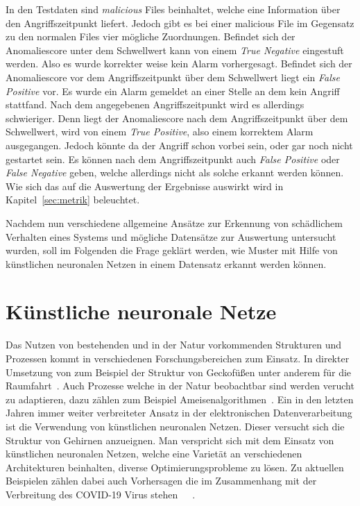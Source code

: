             In den Testdaten sind \textit{malicious}  Files beinhaltet, welche eine Information über den Angriffszeitpunkt liefert. 
            Jedoch gibt es bei einer malicious File im Gegensatz zu den normalen Files  vier mögliche Zuordnungen.
            Befindet sich der Anomaliescore unter dem Schwellwert kann von einem \textit{True Negative} eingestuft werden.
            Also es wurde korrekter weise kein Alarm vorhergesagt.
            Befindet sich der Anomaliescore vor dem Angriffszeitpunkt über dem Schwellwert liegt ein \textit{False Positive} vor.
            Es wurde ein Alarm gemeldet an einer Stelle an dem kein Angriff stattfand.
            Nach dem angegebenen Angriffszeitpunkt wird es allerdings schwieriger.
            Denn liegt der Anomaliescore nach dem Angriffszeitpunkt über dem Schwellwert, wird von einem \textit{True Positive}, also einem korrektem Alarm ausgegangen.
            Jedoch könnte da der Angriff schon vorbei sein, oder gar noch nicht gestartet sein.
            Es können nach dem Angriffszeitpunkt auch \textit{False Positive} oder \textit{False Negative} geben, welche allerdings nicht als solche erkannt werden können.
            Wie sich das auf die Auswertung der Ergebnisse auswirkt wird in Kapitel~\ref{sec:metrik} beleuchtet.

            Nachdem nun verschiedene allgemeine Ansätze zur Erkennung von schädlichem Verhalten eines Systems und mögliche Datensätze zur Auswertung untersucht wurden,
            soll im Folgenden die Frage geklärt werden, wie Muster mit Hilfe von künstlichen neuronalen Netzen in einem Datensatz erkannt werden können.

    \section{Künstliche neuronale Netze}\label{sec:KNN}        
        Das Nutzen von bestehenden und in der Natur vorkommenden Strukturen und Prozessen kommt in verschiedenen Forschungsbereichen zum Einsatz.
        In direkter Umsetzung von zum Beispiel der Struktur von Geckofüßen unter anderem für die Raumfahrt~\cite{GECKO}.%
        Auch Prozesse welche in der Natur beobachtbar sind werden verucht zu adaptieren, dazu zählen zum Beispiel Ameisenalgorithmen~\cite{ANT}.
        Ein in den letzten Jahren immer weiter verbreiteter Ansatz in der elektronischen Datenverarbeitung ist die Verwendung von künstlichen neuronalen Netzen.
        Dieser versucht sich die Struktur von Gehirnen anzueignen.
        Man verspricht sich mit dem Einsatz von künstlichen neuronalen Netzen, welche eine Varietät an verschiedenen Architekturen beinhalten, diverse Optimierungsprobleme zu lösen.
        Zu aktuellen Beispielen zählen dabei auch Vorhersagen die im Zusammenhang mit der Verbreitung des COVID-19 Virus stehen~\cite{COVID1}~\cite{COVID2}~\cite{COVID3}.
        
